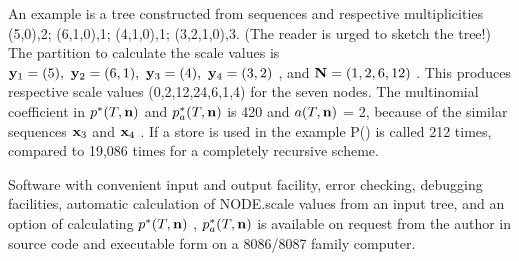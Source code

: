     An example is a tree constructed from sequences
and respective multiplicities
(5,0),2; (6,1,0),1; (4,1,0),1; (3,2,1,0),3.
(The reader is urged to sketch the tree!) 
The partition to calculate the scale values is
${\bf y}_1 = (5),~{\bf y}_2 = (6,1),~{\bf y}_3 = (4),~{\bf y}_4 = (3,2)$ ,
and ${\bf N} = (1,2,6,12)$ . This produces respective scale values 
(0,2,12,24,6,1,4) for the seven nodes.
The multinomial coefficient in $p^*(T,{\bf n})$
and $p_a^*(T,{\bf n})$ is 420 and $a(T,{\bf n})$ = 2, because of the
similar sequences ${\bf x}_3$ and ${\bf x}_4$ .
If a store is used in the example {\sf P()} is called 212 times, 
compared to 19,086 times for a completely recursive scheme.

    Software with convenient input and output facility, 
error checking, debugging facilities,
automatic calculation
of {\sf NODE.scale} values from an input tree, and an option of
calculating $p^*(T,{\bf n})$ , $p^*_a(T,{\bf n})$ 
is available on request from the author in source code and executable
form on a 8086/8087 family computer.
\newpage

